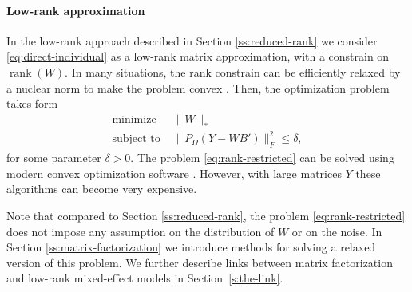\documentclass[preprint]{imsart}
\numberwithin{equation}{section}
\theoremstyle{plain}
\DeclareMathOperator*{\rank}{rank}
\begin{document}
\paragraph{Low-rank approximation}
In the low-rank approach described in Section \ref{ss:reduced-rank} we consider \eqref{eq:direct-individual} as a low-rank matrix approximation, with a constrain on $\rank{(W)}$. In many situations, the rank constrain can be efficiently relaxed by a nuclear norm to make the problem convex \citep{candes2009exact, fazel2002matrix}. Then, the optimization problem takes form 
\begin{align}
\text{minimize\ \ } & \|W\|_* \nonumber\\
\text{subject to\ \ } &\| P_\Omega(Y - WB') \|_F^2 \leq \delta,\label{eq:rank-restricted}
\end{align} 
for some parameter $\delta > 0$. 
The problem \eqref{eq:rank-restricted} can be solved using modern convex optimization software \citep{grant2008graph,boyd2004convex}. However, with large matrices $Y$ these algorithms can become very expensive.

Note that compared to Section \ref{ss:reduced-rank}, the problem \eqref{eq:rank-restricted} does not impose any assumption on the distribution of $W$ or on the noise.
In Section \ref{ss:matrix-factorization} we introduce methods for solving a relaxed version of this problem. We further describe links between matrix factorization and low-rank mixed-effect models in Section~\ref{s:the-link}. 

\end{document}
